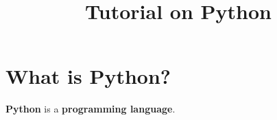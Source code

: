 \documentclass[12pt]{article}
\title{Tutorial on Python}
\begin{document}
\maketitle
\singlespacing
\section{What is Python?}
\textbf{Python} is a \textbf{programming language}.
\end{document}
